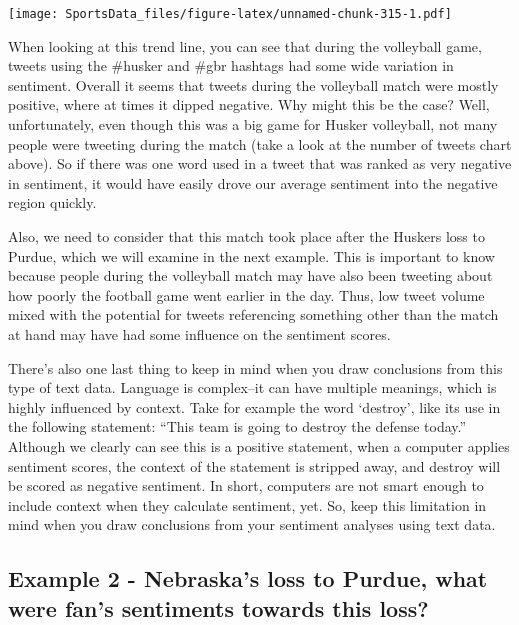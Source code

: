 \documentclass[]{book}
\begin{document}
\texttt{[image: SportsData\_files/figure-latex/unnamed-chunk-315-1.pdf]}

When looking at this trend line, you can see that during the volleyball game, tweets using the \#husker and \#gbr hashtags had some wide variation in sentiment. Overall it seems that tweets during the volleyball match were mostly positive, where at times it dipped negative. Why might this be the case? Well, unfortunately, even though this was a big game for Husker volleyball, not many people were tweeting during the match (take a look at the number of tweets chart above). So if there was one word used in a tweet that was ranked as very negative in sentiment, it would have easily drove our average sentiment into the negative region quickly.

Also, we need to consider that this match took place after the Huskers loss to Purdue, which we will examine in the next example. This is important to know because people during the volleyball match may have also been tweeting about how poorly the football game went earlier in the day. Thus, low tweet volume mixed with the potential for tweets referencing something other than the match at hand may have had some influence on the sentiment scores.

There's also one last thing to keep in mind when you draw conclusions from this type of text data. Language is complex--it can have multiple meanings, which is highly influenced by context. Take for example the word `destroy', like its use in the following statement: ``This team is going to destroy the defense today.'' Although we clearly can see this is a positive statement, when a computer applies sentiment scores, the context of the statement is stripped away, and destroy will be scored as negative sentiment. In short, computers are not smart enough to include context when they calculate sentiment, yet. So, keep this limitation in mind when you draw conclusions from your sentiment analyses using text data.

\hypertarget{example-2---nebraskas-loss-to-purdue-what-were-fans-sentiments-towards-this-loss}{%
\subsection{Example 2 - Nebraska's loss to Purdue, what were fan's sentiments towards this loss?}\label{example-2---nebraskas-loss-to-purdue-what-were-fans-sentiments-towards-this-loss}}
\end{document}
